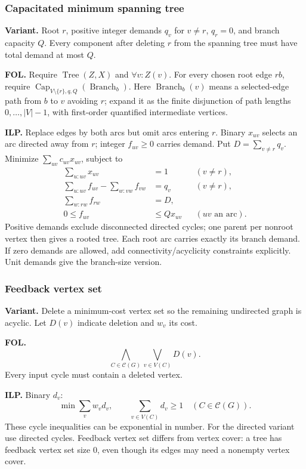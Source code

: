 \subsubsection{Capacitated minimum spanning tree}\label{form:cmst}
\textbf{Variant.} Root $r$, positive integer demands $q_v$ for $v\ne r$,
$q_r=0$, and branch capacity $Q$. Every component after deleting $r$ from
the spanning tree must have total demand at most $Q$.

\textbf{FOL.} Require $\operatorname{Tree}(Z,X)$ and $\forall v:Z(v)$.
For every chosen root edge $rb$, require
$\operatorname{Cap}_{V\setminus\{r\},q,Q}(\operatorname{Branch}_b)$.
Here $\operatorname{Branch}_b(v)$ means a selected-edge path from $b$ to $v$
avoiding $r$; expand it as the finite disjunction of path lengths
$0,\ldots,|V|-1$, with first-order quantified intermediate vertices.

\textbf{ILP.} Replace edges by both arcs but omit arcs entering $r$.
Binary $x_{uv}$ selects an arc directed away from $r$; integer $f_{uv}\ge0$
carries demand. Put $D=\sum_{v\ne r}q_v$. Minimize
$\sum_{uv}c_{uv}x_{uv}$, subject to
\[
\begin{aligned}
 \sum_{u:uv}x_{uv}&=1 &&(v\ne r),\\
 \sum_{u:uv}f_{uv}-\sum_{w:vw}f_{vw}&=q_v &&(v\ne r),\\
 \sum_{w:rw}f_{rw}&=D,\\
 0\le f_{uv}&\le Qx_{uv} &&(uv\text{ an arc}).
\end{aligned}
\]
Positive demands exclude disconnected directed cycles; one parent per
nonroot vertex then gives a rooted tree. Each root arc carries exactly its
branch demand. If zero demands are allowed, add connectivity/acyclicity
constraints explicitly. Unit demands give the branch-size version.

\subsubsection{Feedback vertex set}\label{form:fvs}
\textbf{Variant.} Delete a minimum-cost vertex set so the remaining
undirected graph is acyclic. Let $D(v)$ indicate deletion and $w_v$ its cost.

\textbf{FOL.}
\[
 \bigwedge_{C\in\mathcal C(G)}\bigvee_{v\in V(C)}D(v).
\]
Every input cycle must contain a deleted vertex.

\textbf{ILP.} Binary $d_v$:
\[
 \min\sum_vw_vd_v,\qquad
 \sum_{v\in V(C)}d_v\ge1\quad(C\in\mathcal C(G)).
\]
These cycle inequalities can be exponential in number. For the directed
variant use directed cycles. Feedback vertex set differs from vertex cover:
a tree has feedback vertex set size 0, even though its edges may need a
nonempty vertex cover.

